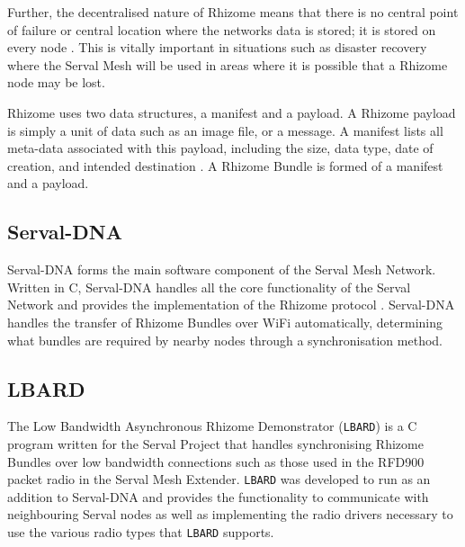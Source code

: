 Further, the decentralised nature of Rhizome means that there is no central point of failure or central location where the networks data is stored; it is stored on every node \parencite{servalWiFiMultiModel}.
This is vitally important in situations such as disaster recovery where the Serval Mesh will be used in areas where it is possible that a Rhizome node may be lost.

Rhizome uses two data structures, a manifest and a payload.
A Rhizome payload is simply a unit of data such as an image file, or a message.
A manifest lists all meta-data associated with this payload, including the size, data type, date of creation, and intended destination \parencite{gardner2011serval}.
A Rhizome Bundle is formed of a manifest and a payload. 

\subsection{Serval-DNA}
Serval-DNA forms the main software component of the Serval Mesh Network.
Written in C, Serval-DNA handles all the core functionality of the Serval Network and provides the implementation of the Rhizome protocol \parencite{servalMesh2013}. 
Serval-DNA handles the transfer of Rhizome Bundles over WiFi automatically, determining what bundles are required by nearby nodes through a synchronisation method.

\subsection{LBARD}
The Low Bandwidth Asynchronous Rhizome Demonstrator (\texttt{LBARD}) is a C program written for the Serval Project that handles synchronising Rhizome Bundles over low bandwidth connections such as those used in the RFD900 packet radio in the Serval Mesh Extender.
\texttt{LBARD} was developed to run as an addition to Serval-DNA and provides the functionality to communicate with neighbouring Serval nodes as well as implementing the radio drivers necessary to use the various radio types that \texttt{LBARD} supports.


